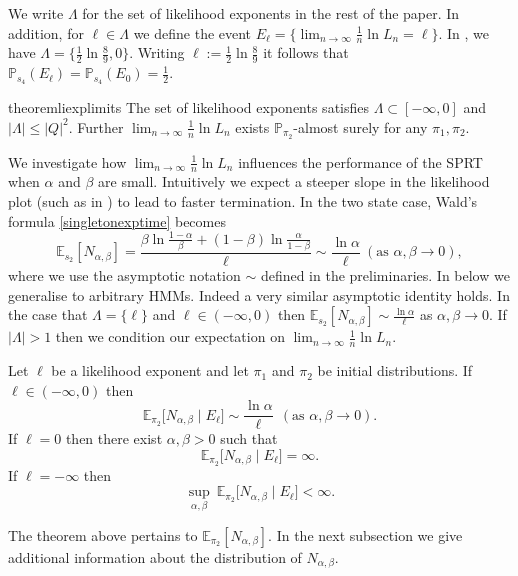\documentclass[a4paper,UKenglish,cleveref, autoref,mathscr]{lipics-v2019}
\newcommand{\EE}{\mathbb{E}}
\newcommand{\PP}{\mathbb{P}}
\newcommand{\1}{\mathbbm{1}}
\newcommand{\liexp}{\lim_{n\rightarrow\infty} \frac1n \ln L_n}
\begin{document}
We write $\Lambda$ for the set of likelihood exponents in the rest of the paper. In addition, for $\ell \in \Lambda$ we define the event $E_\ell = \{\liexp = \ell\}$. In , we have $\Lambda = \{\frac12 \ln \frac89, 0\}$. Writing $\ell := \frac12 \ln \frac89$ it follows that $\PP_{s_4}(E_{\ell}) = \PP_{s_4}(E_0) = \frac12$.

\begin{restatable}{theorem}{liexplimits}\label{liexplimits}
The set of likelihood exponents satisfies $\Lambda \subset [-\infty, 0]$ and $|\Lambda| \leq |Q|^2$. Further $\liexp$ exists $\PP_{\pi_2}$-almost surely for any $\pi_1, \pi_2$.
\end{restatable}





We investigate how $\liexp$ influences the performance of the SPRT when $\alpha$ and $\beta$ are small. Intuitively we expect a steeper slope in the likelihood plot (such as in ) to lead to faster termination. In the two state case, Wald's formula \eqref{singletonexptime} becomes 
\begin{equation}\label{asymptoticwaldeq}
\EE_{s_2}[N_{\alpha, \beta}] = \frac{\beta \ln \frac{1 - \alpha}{\beta} + (1 - \beta) \ln \frac{\alpha}{1 - \beta}}{\ell} \sim \frac{\ln \alpha}{\ell} \ (\text{as } \alpha, \beta \rightarrow 0),
\end{equation}
where we use the asymptotic notation $\sim$ defined in the preliminaries. In  below we generalise  to arbitrary HMMs. Indeed a very similar asymptotic identity holds. In the case that $\Lambda = \{\ell\}$ and $\ell \in (-\infty, 0)$ then $\EE_{s_2}[N_{\alpha, \beta}] \sim \frac{\ln \alpha}{\ell}$ as $\alpha, \beta \rightarrow 0$. If $|\Lambda| > 1$ then we condition our expectation on $\liexp$. 

\begin{theorem}\label{asymptoticwald}
Let $\ell$ be a likelihood exponent and let $\pi_1$ and $\pi_2$ be initial distributions. If $\ell \in (-\infty, 0)$ then
\begin{equation*}
\EE_{\pi_2} \Big[ N_{\alpha,\beta} \mid E_{\ell}\Big] \sim \frac{\ln \alpha}{\ell} \ \ (\text{as } \alpha, \beta \rightarrow 0).
\end{equation*}
If $\ell = 0$ then there exist $\alpha, \beta > 0$ such that 
\begin{equation}
\EE_{\pi_2} \Big[ N_{\alpha,\beta} \mid E_\ell\Big] = \infty.
\end{equation}
If $\ell = -\infty$ then 
\begin{equation*}
\sup_{\alpha, \beta}~\EE_{\pi_2} \Big[ N_{\alpha,\beta} \mid E_\ell \Big] < \infty.
\end{equation*}
\end{theorem} 
The theorem above pertains to $\EE_{\pi_2}[N_{\alpha, \beta}]$. In the next subsection we give additional information about the distribution of $N_{\alpha, \beta}$.
\end{document}
